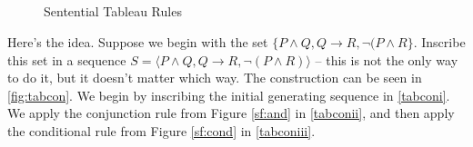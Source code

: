 \begin{figure}
    \centering
{}\qquad
{}\\
\qquad
{}\\
\qquad
{}\\
\qquad
{}\\
  \caption{Sentential Tableau Rules \label{fig:stableaux}}
\end{figure}

Here's the idea. Suppose we begin with the set $\{P\wedge Q,Q \to R, ¬(P\wedge R\}$. Inscribe this set in a sequence $S = \langle P\wedge Q,Q \to R, ¬(P\wedge R)\rangle$ – this is not the only way to do it, but it doesn't matter which way. The construction can be seen in \autoref{fig:tabcon}. We begin by inscribing the initial generating sequence in \ref{tabconi}. We apply the conjunction rule from Figure \ref{sf:and} in \ref{tabconii}, and then apply the conditional rule from Figure \ref{sf:cond} in \ref{tabconiii}.

